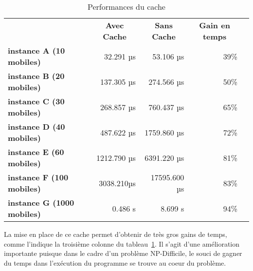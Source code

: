         \begin{table}[H]
            \centering
            \begin{tabular}{l|r|r|r|l}
            \cline{2-4}
                                                                     & \multicolumn{1}{c|}{\textbf{Avec Cache}} & \multicolumn{1}{c|}{\textbf{Sans Cache}} & \multicolumn{1}{c|}{\textbf{Gain en temps}} &  \\ \cline{1-4}
            \multicolumn{1}{|l|}{\textbf{instance A (10 mobiles)}}   & 32.291 µs                               & 53.106 µs                               & 39\%                               &  \\ \cline{1-4}
            \multicolumn{1}{|l|}{\textbf{instance B (20 mobiles)}}   & 137.305 µs                               & 274.566 µs                               & 50\%                               &  \\ \cline{1-4}
            \multicolumn{1}{|l|}{\textbf{instance C (30 mobiles)}}   & 268.857 µs                               & 760.437 µs                               & 65\%                               &  \\ \cline{1-4}
            \multicolumn{1}{|l|}{\textbf{instance D (40 mobiles)}}   & 487.622 µs                               & 1759.860 µs                               & 72\%                               &  \\ \cline{1-4}
            \multicolumn{1}{|l|}{\textbf{instance E (60 mobiles)}}   & 1212.790 µs                               & 6391.220 µs                               & 81\%                               &  \\ \cline{1-4}
            \multicolumn{1}{|l|}{\textbf{instance F (100 mobiles)}}  & 3038.210µs                                & 17595.600 µs                               & 83\%                               &  \\ \cline{1-4}
            \multicolumn{1}{|l|}{\textbf{instance G (1000 mobiles)}} & 0.486 s                                & 8.699 s                           & 94\%                               &  \\ \cline{1-4}
            \end{tabular}
            \caption{Performances du cache}
            \label{tab:cache-perf}
        \end{table}
    	
    	La mise en place de ce cache permet d'obtenir de très gros gains de temps, comme l'indique la troisième colonne du tableau~\ref{tab:cache-perf}. Il s'agit d'une amélioration importante puisque dans le cadre d'un problème NP-Difficile, le souci de gagner du temps dans l'exécution du programme se trouve au coeur du problème.
    	
